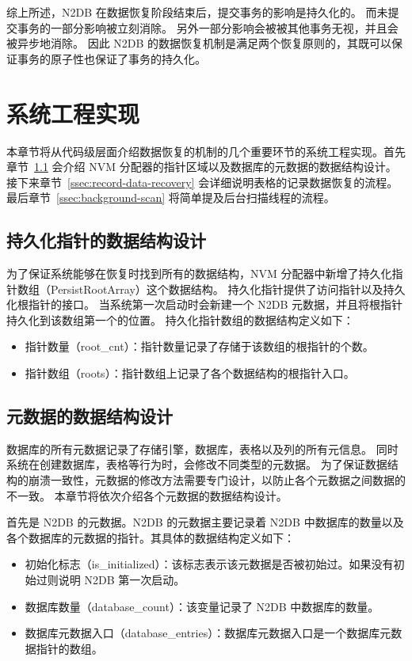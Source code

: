综上所述，N2DB 在数据恢复阶段结束后，提交事务的影响是持久化的。
而未提交事务的一部分影响被立刻消除。
另外一部分影响会被被其他事务无视，并且会被异步地消除。
因此 N2DB 的数据恢复机制是满足两个恢复原则的，其既可以保证事务的原子性也保证了事务的持久化。

\section{系统工程实现}
本章节将从代码级层面介绍数据恢复的机制的几个重要环节的系统工程实现。首先章节~\ref{ssec:data-structure-recovery} 会介绍 NVM 分配器的指针区域以及数据库的元数据的数据结构设计。
接下来章节~\ref{ssec:record-data-recovery} 会详细说明表格的记录数据恢复的流程。
最后章节~\ref{ssec:background-scan} 将简单提及后台扫描线程的流程。

\subsection{持久化指针的数据结构设计}
\label{ssec:data-structure-recovery}

为了保证系统能够在恢复时找到所有的数据结构，NVM 分配器中新增了持久化指针数组（PersistRootArray）这个数据结构。
持久化指针提供了访问指针以及持久化根指针的接口。
当系统第一次启动时会新建一个 N2DB 元数据，并且将根指针持久化到该数组第一个的位置。
持久化指针数组的数据结构定义如下：
\begin{itemize}
    \item 指针数量（root\_cnt）：指针数量记录了存储于该数组的根指针的个数。
    \item 指针数组（roots）：指针数组上记录了各个数据结构的根指针入口。
\end{itemize}



\subsection{元数据的数据结构设计}

数据库的所有元数据记录了存储引擎，数据库，表格以及列的所有元信息。
同时系统在创建数据库，表格等行为时，会修改不同类型的元数据。
为了保证数据结构的崩溃一致性，元数据的修改方法需要专门设计，以防止各个元数据之间数据的不一致。
本章节将依次介绍各个元数据的数据结构设计。

首先是 N2DB 的元数据。N2DB 的元数据主要记录着 N2DB 中数据库的数量以及各个数据库的元数据的指针。其具体的数据结构定义如下：
\begin{itemize}
    \item 初始化标志（is\_initialized）：该标志表示该元数据是否被初始过。如果没有初始过则说明 N2DB 第一次启动。
    \item 数据库数量（database\_count）：该变量记录了 N2DB 中数据库的数量。
    \item 数据库元数据入口（database\_entries）：数据库元数据入口是一个数据库元数据指针的数组。
\end{itemize}

